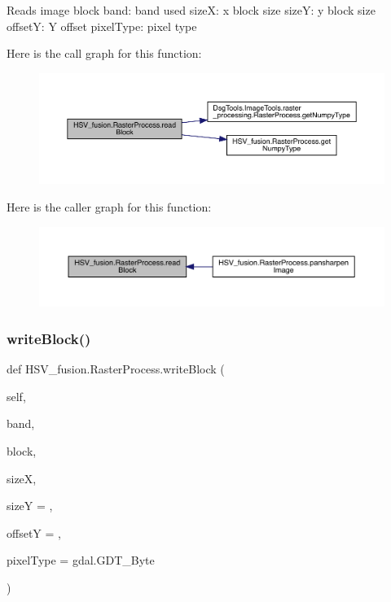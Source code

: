 \begin{DoxyVerb}Reads image block
band: band used
sizeX: x block size
sizeY: y block size
offsetY: Y offset
pixelType: pixel type
\end{DoxyVerb}
 Here is the call graph for this function\+:
\nopagebreak
\begin{figure}[H]
\begin{center}
\leavevmode
\includegraphics[width=350pt]{class_h_s_v__fusion_1_1_raster_process_a1c123d5883dc2c2783391cdb7ebfe738_cgraph}
\end{center}
\end{figure}
Here is the caller graph for this function\+:
\nopagebreak
\begin{figure}[H]
\begin{center}
\leavevmode
\includegraphics[width=350pt]{class_h_s_v__fusion_1_1_raster_process_a1c123d5883dc2c2783391cdb7ebfe738_icgraph}
\end{center}
\end{figure}
\mbox{\label{class_h_s_v__fusion_1_1_raster_process_a602e8caa6f0961893dafcb169f191373}} 
\subsubsection{\texorpdfstring{write\+Block()}{writeBlock()}}
{\footnotesize\ttfamily def H\+S\+V\+\_\+fusion.\+Raster\+Process.\+write\+Block (\begin{DoxyParamCaption}\item[{}]{self,  }\item[{}]{band,  }\item[{}]{block,  }\item[{}]{sizeX,  }\item[{}]{sizeY = {},  }\item[{}]{offsetY = {},  }\item[{}]{pixel\+Type = {\ttfamily gdal.GDT\+\_\+Byte} }\end{DoxyParamCaption})}

